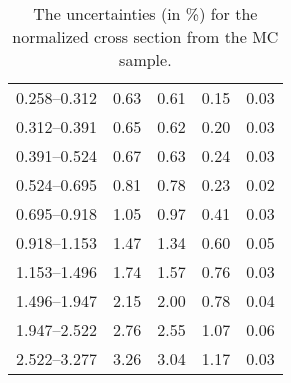 \begin{table}
\begin{center}
\begin{tabular}{@{}l l l l l@{}}
            0.258--0.312 & 0.63 & 0.61 & 0.15 & 0.03  \\
            0.312--0.391 & 0.65 & 0.62 & 0.20 & 0.03  \\
            0.391--0.524 & 0.67 & 0.63 & 0.24 & 0.03  \\
            0.524--0.695 & 0.81 & 0.78 & 0.23 & 0.02  \\
            0.695--0.918 & 1.05 & 0.97 & 0.41 & 0.03  \\
            0.918--1.153 & 1.47 & 1.34 & 0.60 & 0.05  \\
            1.153--1.496 & 1.74 & 1.57 & 0.76 & 0.03  \\
            1.496--1.947 & 2.15 & 2.00 & 0.78 & 0.04  \\
            1.947--2.522 & 2.76 & 2.55 & 1.07 & 0.06  \\
            2.522--3.277 & 3.26 & 3.04 & 1.17 & 0.03  \\
            \bottomrule
        \end{tabular}
    \end{center}
    \caption[
        The uncertainties for the normalized cross section from the \POWHEG MC
        sample.
    ]{
        The uncertainties (in \%) for the normalized cross section from the
        \POWHEG MC sample.
    }
    \label{tab:powheg_uncert_norm}
\end{table}
